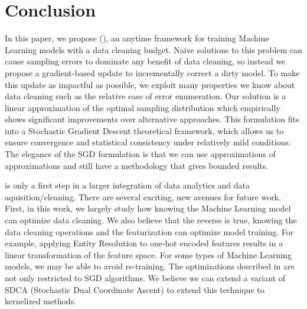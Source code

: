 \section{Conclusion}
In this paper, we propose \sysfull (\sys), an anytime framework for training Machine Learning models with a data cleaning budget.
Naive solutions to this problem can cause sampling errors to dominate any benefit of data cleaning, so instead we propose a gradient-based update to incrementally correct a dirty model.
To make this update as impactful as possible, we exploit many properties we know about data cleaning such as the relative ease of error enumeration.
Our solution is a linear approximation of the optimal sampling distribution which empirically shows significant improvements over alternative approaches.
This formulation fits into a Stochastic Gradient Descent theoretical framework, which allows us to ensure convergence and statistical consistency under relatively mild conditions.
The elegance of the SGD formulation is that we can use approximations of approximations and still have a methodology that gives bounded results.

\sys is only a first step in a larger integration of data analytics and data aquisition/cleaning. 
There are several exciting, new avenues for future work.
First, in this work, we largely study how knowing the Machine Learning model can optimize data cleaning.
We also believe that the reverse is true, knowing the data cleaning operations and the featurization can optimize model training.
For example, applying Entity Resolution to one-hot encoded features results in a linear transformation of the feature space.
For some types of Machine Learning models, we may be able to avoid re-training.
The optimizations described in \sys are not only restricted to SGD algorithms. 
We believe we can extend a variant of SDCA (Stochastic Dual Coordinate Ascent) \cite{jaggi2014communication} to extend this technique to kernelized methods.
